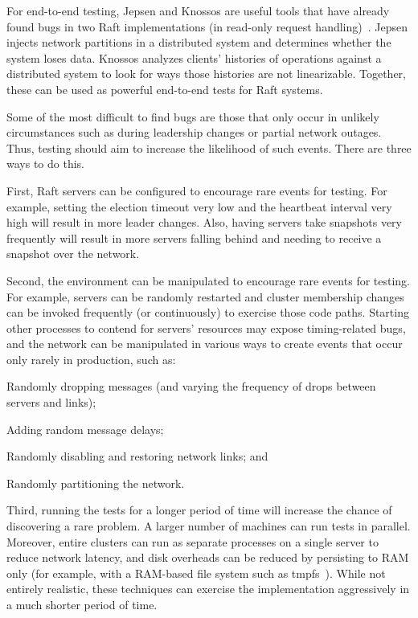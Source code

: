 For end-to-end testing, Jepsen and Knossos are useful tools that have
already found bugs in two Raft implementations (in read-only request
handling)~\cite{Kingsbury:etcdconsul}. Jepsen injects network partitions
in a distributed system and determines whether the system loses data.
Knossos analyzes clients' histories of operations against a distributed
system to look for ways those histories are not linearizable. Together,
these can be used as powerful end-to-end tests for Raft systems.

Some of the most difficult to find bugs are those that only occur in
unlikely circumstances such as during leadership changes or partial
network outages. Thus, testing should aim to increase the likelihood of
such events. There are three ways to do this.

First, Raft servers can be configured to encourage rare events for
testing. For example, setting the election timeout very low and the
heartbeat interval very high will result in more leader changes. Also,
having servers take snapshots very frequently will result in more
servers falling behind and needing to receive a snapshot over the
network.

Second, the environment can be manipulated to encourage rare events for
testing. For example, servers can be randomly restarted and cluster
membership changes can be invoked frequently (or continuously) to
exercise those code paths. Starting other processes to contend for
servers' resources may expose timing-related bugs, and the network can
be manipulated in various ways to create events that occur only rarely
in production, such as:
%
\begin{compactitem}
%
\item Randomly dropping messages (and varying the frequency of drops
between servers and links);
%
\item Adding random message delays;
%
\item Randomly disabling and restoring network links; and
%
\item Randomly partitioning the network.
%
\end{compactitem}

Third, running the tests for a longer period of time will increase the
chance of discovering a rare problem. A larger number of machines can
run tests in parallel. Moreover, entire clusters can run as separate
processes on a single server to reduce network latency, and disk
overheads can be reduced by persisting to RAM only (for example, with a
RAM-based file system such as tmpfs~\cite{tmpfs}). While not entirely
realistic, these techniques can exercise the implementation aggressively
in a much shorter period of time.

